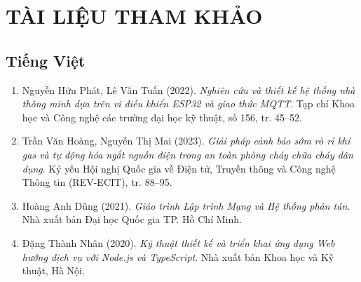 \chapter*{TÀI LIỆU THAM KHẢO}

\section*{Tiếng Việt}
\begin{enumerate}
    \item Nguyễn Hữu Phát, Lê Văn Tuấn (2022). \textit{Nghiên cứu và thiết kế hệ thống nhà thông minh dựa trên vi điều khiển ESP32 và giao thức MQTT}. Tạp chí Khoa học và Công nghệ các trường đại học kỹ thuật, số 156, tr. 45–52.
    \item Trần Văn Hoàng, Nguyễn Thị Mai (2023). \textit{Giải pháp cảnh báo sớm rò rỉ khí gas và tự động hóa ngắt nguồn điện trong an toàn phòng cháy chữa cháy dân dụng}. Kỷ yếu Hội nghị Quốc gia về Điện tử, Truyền thông và Công nghệ Thông tin (REV-ECIT), tr. 88–95.
    \item Hoàng Anh Dũng (2021). \textit{Giáo trình Lập trình Mạng và Hệ thống phân tán}. Nhà xuất bản Đại học Quốc gia TP. Hồ Chí Minh.
    \item Đặng Thành Nhân (2020). \textit{Kỹ thuật thiết kế và triển khai ứng dụng Web hướng dịch vụ với Node.js và TypeScript}. Nhà xuất bản Khoa học và Kỹ thuật, Hà Nội.
\end{enumerate}

\vspace{0.5cm}
